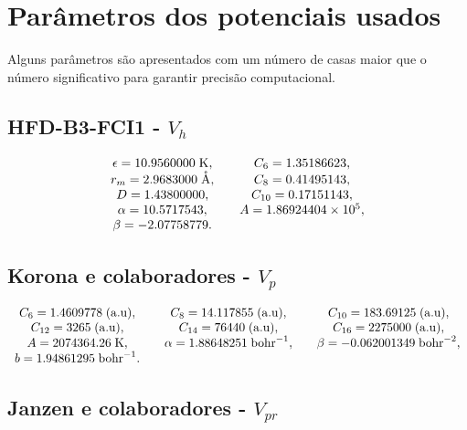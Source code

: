 \documentclass[12pt,twoside,a4paper]{report}
\begin{document}
\newpage

\chapter{Parâmetros dos potenciais usados} \label{potparam}

Alguns parâmetros são apresentados com um número de casas maior que o número
significativo para
garantir precisão computacional.

\section{HFD-B3-FCI1 - $V_h$}

\begin{equation} \nonumber
\begin{array}{ccc}
\epsilon=10.9560000 \; {\rm K}, & & C_6=1.35186623, \\
r_m=2.9683000 \; {\rm \mathring{A}}, & & C_8=0.41495143,\\
D=1.43800000, & & C_{10}=0.17151143, \\
\alpha=10.5717543, & & A=1.86924404 \times 10^5, \\
\beta=-2.07758779.
\end{array}
\end{equation}

\section{Korona e colaboradores - $V_p$}

\begin{equation} \nonumber
\begin{array}{ccccc}
C_6=1.4609778 \; {\rm (a.u)}, & & C_8=14.117855 \; {\rm (a.u)} ,& & 
C_{10}=183.69125 \; {\rm
(a.u)}, \\
C_{12}=3265 \; {\rm (a.u)}, & & C_{14}=76440 \; {\rm (a.u)}, & & 
C_{16}=2275000 \; {\rm (a.u)},
\\
A=2074364.26 \; {\rm K}, & & \alpha=1.88648251 \; {\rm bohr}^{-1}, & & 
\beta=-0.062001349 \;
{\rm
bohr}^{-2}, \\
b=1.94861295 \; {\rm bohr}^{-1}.
\end{array}
\end{equation}

\section{Janzen e colaboradores - $V_{pr}$}
\end{document}
